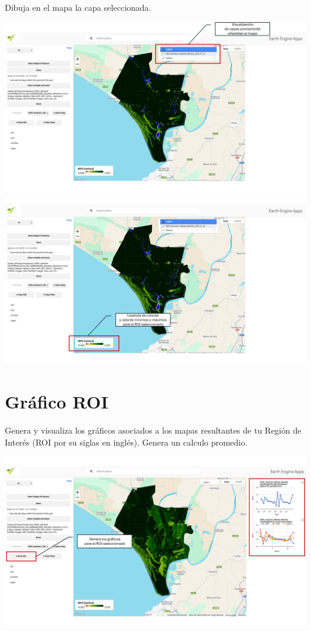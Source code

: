 \documentclass[
]{book}
\begin{document}
Dibuja en el mapa la capa seleccionada.

\includegraphics{assets/layers_es2.png}
\includegraphics{assets/leyenda_es.png}

\section{\texorpdfstring{\textbf{Gráfico ROI}}{Gráfico ROI}}\label{gruxe1fico-roi}

Genera y visualiza los gráficos asociados a los mapas resultantes de tu Región de Interés (ROI por su siglas en inglés). Genera un calculo promedio.

\includegraphics{assets/graphs_es.png}
\end{document}
